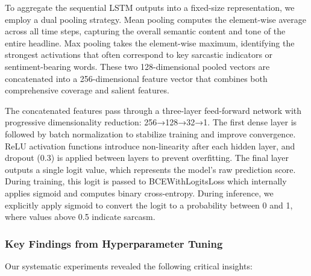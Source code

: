 \documentclass[11pt]{article}
\begin{document}
To aggregate the sequential LSTM outputs into a fixed-size representation, we employ a dual pooling strategy. Mean pooling computes the element-wise average across all time steps, capturing the overall semantic content and tone of the entire headline. Max pooling takes the element-wise maximum, identifying the strongest activations that often correspond to key sarcastic indicators or sentiment-bearing words. These two 128-dimensional pooled vectors are concatenated into a 256-dimensional feature vector that combines both comprehensive coverage and salient features.

The concatenated features pass through a three-layer feed-forward network with progressive dimensionality reduction: 256→128→32→1. The first dense layer is followed by batch normalization to stabilize training and improve convergence. ReLU activation functions introduce non-linearity after each hidden layer, and dropout (0.3) is applied between layers to prevent overfitting. The final layer outputs a single logit value, which represents the model's raw prediction score. During training, this logit is passed to BCEWithLogitsLoss which internally applies sigmoid and computes binary cross-entropy. During inference, we explicitly apply sigmoid to convert the logit to a probability between 0 and 1, where values above 0.5 indicate sarcasm.


\subsubsection{Key Findings from Hyperparameter Tuning}

Our systematic experiments revealed the following critical insights:
\end{document}
